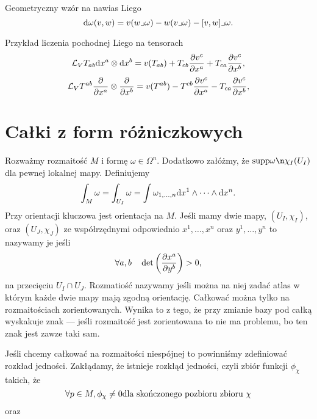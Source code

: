 \documentclass[11pt]{book}
\theoremstyle{definition} %
\theoremstyle{plain} %
\theoremstyle{remark} %
\theoremstyle{underline}
\begin{document}
  Geometryczny wzór na nawias Liego
  \begin{displaymath}
    \mathrm{d} \omega(v, w) = v(w \lrcorner \omega) - w(v \lrcorner \omega) - [v,w]\lrcorner\omega.
  \end{displaymath}
  

  Przykład liczenia pochodnej Liego na tensorach
  \begin{displaymath}
    \mathcal{L}_V T_{ab} \mathrm{d} x^a \otimes \mathrm{d} x^b = v(T_{ab}) + T_{cb} \frac{\partial v^c}{\partial x^a}+ T_{ca} \frac{\partial v^c}{\partial x^b},
  \end{displaymath}
  \begin{displaymath}
    \mathcal{L}_V T^{ab}\frac{\partial }{\partial x^a} \otimes \frac{\partial }{\partial x^b} = v(T^{ab}) - T^{cb} \frac{\partial v^c}{\partial x^a} - T_{ca} \frac{\partial v^c}{\partial x^b},
  \end{displaymath}

  \section{Całki z form różniczkowych}
  
  Rozważmy rozmaitość $M$ i formę $\omega \in \Omega^n$.
  Dodatkowo załóżmy, że $\supp\omega \n \chi_I(U_I)$ dla pewnej lokalnej mapy.
  Definiujemy 
  \begin{displaymath}
    \int_M\omega = \int_{U_I} \omega  = \int \omega_{1, \dots, n} \mathrm{d} x^1 \wedge \dots \wedge \mathrm{d} x^n.
  \end{displaymath}
  Przy orientacji kluczowa jest orientacja na $M$.
  Jeśli mamy dwie mapy, $(U_I, \chi_I)$, oraz $(U_J, \chi_J)$ ze współrzędnymi odpowiednio $x^1, \dots, x^n$
  oraz $y^1, \dots, y^n$ to nazywamy je  jeśli 
  \begin{displaymath}
    \forall a, b \quad \det \left( \frac{\partial x^a}{\partial y^b} \right) > 0,
  \end{displaymath}
  na przecięciu $U_I\cap U_J$.
  Rozmatiość nazywamy  jeśli można na niej zadać atlas w którym każde dwie mapy mają zgodną
  orientację.
  Całkować można tylko na rozmaitościach zorientowanych.
  Wynika to z tego, że przy zmianie bazy pod całką wyskakuje znak --- jeśli rozmaitość jest zorientowana to 
  nie ma problemu, bo ten znak jest zawze taki sam.

  Jeśli chcemy całkować na rozmaitości niespójnej to powinniśmy zdefiniować rozkład jedności.
  Zakłądamy, że istnieje rozkłąd jedności, czyli zbiór funkcji $\phi_\chi$ takich, że
  \begin{displaymath}
    \forall p \in M, \phi_\chi \neq 0 \textrm{dla skończonego pozbioru zbioru }\chi
  \end{displaymath}
  oraz
  
\end{document}

